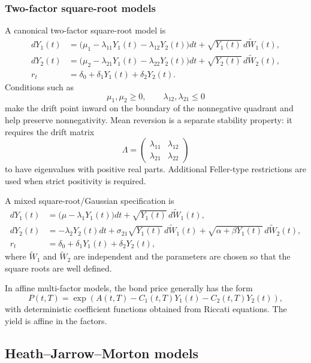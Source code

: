 \subsubsection*{Two-factor square-root models}

A canonical two-factor square-root model is
\[
\begin{aligned}
dY_1(t)
&=\bigl(\mu_1-\lambda_{11}Y_1(t)-\lambda_{12}Y_2(t)\bigr)dt
 +\sqrt{Y_1(t)}\,d\widetilde W_1(t),\\
dY_2(t)
&=\bigl(\mu_2-\lambda_{21}Y_1(t)-\lambda_{22}Y_2(t)\bigr)dt
 +\sqrt{Y_2(t)}\,d\widetilde W_2(t),\\
r_t&=\delta_0+\delta_1Y_1(t)+\delta_2Y_2(t).
\end{aligned}
\]
Conditions such as
\[
\mu_1,\mu_2\geq0,
\qquad
\lambda_{12},\lambda_{21}\leq0
\]
make the drift point inward on the boundary of the nonnegative quadrant and help preserve nonnegativity. Mean reversion is a separate stability property: it requires the drift matrix
\[
\Lambda=
\begin{pmatrix}
\lambda_{11}&\lambda_{12}\\
\lambda_{21}&\lambda_{22}
\end{pmatrix}
\]
to have eigenvalues with positive real parts. Additional Feller-type restrictions are used when strict positivity is required.

A mixed square-root/Gaussian specification is
\[
\begin{aligned}
dY_1(t)
&=\bigl(\mu-\lambda_1Y_1(t)\bigr)dt
 +\sqrt{Y_1(t)}\,d\widetilde W_1(t),\\
dY_2(t)
&=-\lambda_2Y_2(t)dt
 +\sigma_{21}\sqrt{Y_1(t)}\,d\widetilde W_1(t)
 +\sqrt{\alpha+\beta Y_1(t)}\,d\widetilde W_2(t),\\
r_t&=\delta_0+\delta_1Y_1(t)+\delta_2Y_2(t),
\end{aligned}
\]
where $\widetilde W_1$ and $\widetilde W_2$ are independent and the parameters are chosen so that the square roots are well defined.

In affine multi-factor models, the bond price generally has the form
\[
P(t,T)
=\exp\!\left(
 A(t,T)-C_1(t,T)Y_1(t)-C_2(t,T)Y_2(t)
\right),
\]
with deterministic coefficient functions obtained from Riccati equations. The yield is affine in the factors.

\subsection{Heath--Jarrow--Morton models}

